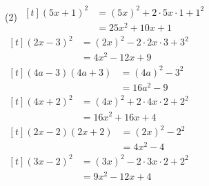 %
%
    \begin{tasks}(2)
        \task
        $\begin{aligned}[t]
                (5x+1)^2
                 & = (5x)^2 + 2\cdot 5x \cdot 1 + 1^2 \\
                 & = 25x^2 + 10x + 1
            \end{aligned}$
        \task
        $\begin{aligned}[t]
                (2x-3)^2
                 & = (2x)^2 - 2\cdot 2x \cdot 3 + 3^2 \\
                 & = 4x^2 - 12x + 9
            \end{aligned}$
        \task
        $\begin{aligned}[t]
                (4a-3)(4a+3)
                 & = (4a)^2 - 3^2 \\
                 & = 16a^2 - 9
            \end{aligned}$
        \task
        $\begin{aligned}[t]
                (4x+2)^2
                 & = (4x)^2 + 2\cdot 4x \cdot 2 + 2^2 \\
                 & = 16x^2 + 16x + 4
            \end{aligned}$
        \task
        $\begin{aligned}[t]
                (2x-2)(2x+2)
                 & = (2x)^2 - 2^2 \\
                 & = 4x^2 - 4
            \end{aligned}$
        \task
        $\begin{aligned}[t]
                (3x-2)^2
                 & = (3x)^2 - 2\cdot 3x\cdot 2+2^2 \\
                 & = 9x^2 - 12x + 4
            \end{aligned}$
    \end{tasks}
